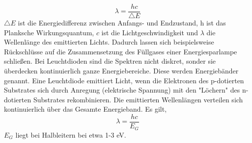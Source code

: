 \begin{equation}
\lambda=\frac{hc}{\triangle E}
\end{equation}
$ \triangle E $ ist die Energiedifferenz zwischen Anfangs- und Endzustand, $ \textit{h} $ ist das Planksche Wirkungsquantum, $ \textit{c} $ ist die Lichtgeschwindigkeit und $ \lambda $ die Wellenlänge des emittierten Lichts. 
Dadurch lassen sich beispielsweise Rückschlüsse auf die Zusammensetzung des Füllgases einer Energiesparlampe schließen.
Bei Leuchtdioden sind die Spektren nicht diskret, sonder sie überdecken kontinuierlich ganze Energiebereiche. Diese werden Energiebänder genannt. 
Eine Leuchtdiode emittiert Licht, wenn die Elektronen des p-dotierten Substrates sich durch Anregung (elektrische Spannung) mit den "Löchern" des n-dotierten Substrates rekombinieren. Die emittierten Wellenlängen verteilen sich kontinuierlich über das Gesamte Energieband. Es gilt,
\begin{equation}
\lambda=\frac{hc}{E_{G}}
\end{equation}
$ E_{G} $ liegt bei Halbleitern bei etwa 1-3 eV.